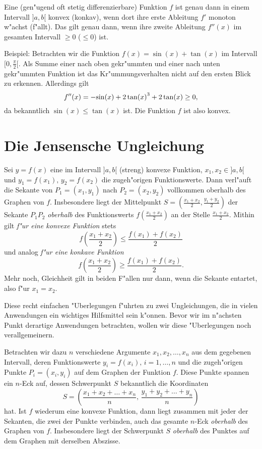 \documentclass[11pt]{article}
\begin{document}
\begin{satz}
Eine (gen"ugend oft stetig differenzierbare) Funktion $f$ ist genau
dann in einem Intervall $]a,b[$ konvex (konkav), wenn dort ihre erste
Ableitung $f'$ monoton w"achst (f"allt). Das gilt genau dann, wenn
ihre zweite Ableitung $f''(x)$ im gesamten Intervall $\geq 0$ ($\leq
0$) ist.
\end{satz}

Beispiel: Betrachten wir die Funktion $f(x)=\sin(x)+\tan(x)$ im
Intervall $[0,\frac{\pi}{2}[$. Als Summe einer nach oben gekr"ummten
und einer nach unten gekr"ummten Funktion ist das Kr"ummungsverhalten
nicht auf den ersten Blick zu erkennen. Allerdings gilt 
\[f''(x)=-{\rm sin}(x) +2\,{{\rm tan}(x)}^{3} +2\,{\rm tan}(x)\geq
0,\]
da bekanntlich $\sin(x)\leq \tan(x)$ ist. Die Funktion $f$ ist also
konvex. 

\section{Die Jensensche Ungleichung}

Sei $y=f(x)$ eine im Intervall $]a,b[$ (streng) konvexe Funktion,
$x_1,x_2\in ]a,b[$ und $y_1=f(x_1),\,y_2=f(x_2)$ die zugeh"origen
Funktionswerte. Dann verl"auft die Sekante von $P_1=(x_1,y_1)$ nach
$P_2=(x_2,y_2)$ vollkommen oberhalb des Graphen von $f$. Insbesondere
liegt der Mittelpunkt $S=(\frac{x_1+x_2}{2}, \frac{y_1+y_2}{2})$ der
Sekante $P_1P_2$ {\em oberhalb} des Funktionswerts
$f(\frac{x_1+x_2}{2})$ an der Stelle $\frac{x_1+x_2}{2}$. Mithin gilt
{\em f"ur eine konvexe Funktion} stets
\[f(\frac{x_1+x_2}{2})\leq \frac{f(x_1)+f(x_2)}{2}\]
und analog {\em f"ur eine konkave Funktion}
\[f(\frac{x_1+x_2}{2})\geq \frac{f(x_1)+f(x_2)}{2}.\]
Mehr noch, Gleichheit gilt in beiden F"allen nur dann, wenn die
Sekante entartet, also f"ur $x_1=x_2$.

Diese recht einfachen "Uberlegungen f"uhrten zu zwei Ungleichungen,
die in vielen Anwendungen ein wichtiges Hilfsmittel sein
k"onnen. Bevor wir im n"achsten Punkt derartige Anwendungen
betrachten, wollen wir diese "Uberlegungen noch verallgemeinern.
\medskip

Betrachten wir dazu $n$ verschiedene Argumente $x_1,x_2,\ldots,x_n$
aus dem gegebenen Intervall, deren Funktionswerte $y_i=f(x_i),\,
i=1,\ldots,n$ und die zugeh"origen Punkte $P_i=(x_i,y_i)$ auf dem
Graphen der Funktion $f$. Diese Punkte spannen ein $n$-Eck auf, dessen
Schwerpunkt $S$ bekanntlich die Koordinaten
\[S=\left(\frac{x_1+x_2+\ldots+x_n}{n},\,\frac{y_1+y_2+\ldots+y_n}{n}
\right) \]
hat. Ist $f$ wiederum eine konvexe Funktion, dann liegt zusammen mit
jeder der Sekanten, die zwei der Punkte verbinden, auch das gesamte
$n$-Eck {\em oberhalb} des Graphen von $f$. Insbesondere liegt der
Schwerpunkt $S$ {\em oberhalb} des Punktes auf dem Graphen mit
derselben Abszisse.
\end{document}
